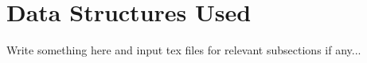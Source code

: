 \section{Data Structures Used}
Write something here and input tex files for relevant subsections if any...
